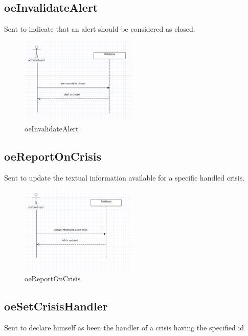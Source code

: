 \subsection{oeInvalidateAlert}
Sent to indicate that an alert should be considered as closed.

\begin{figure}[H]
\begin{center}
\includegraphics[width=0.5\textwidth]{./images/oeInvalidateAlert.eps} 
\end{center}
\caption{oeInvalidateAlert}
\end{figure}

\subsection{oeReportOnCrisis}
Sent to update the textual information available for a specific handled crisis.

\begin{figure}[H]
\begin{center}
\includegraphics[width=0.5\textwidth]{./images/oeReportOnCrisis.eps} 
\end{center}
\caption{oeReportOnCrisis}
\end{figure}

\subsection{oeSetCrisisHandler}
Sent to declare himself as been the handler of a crisis having the specified id

